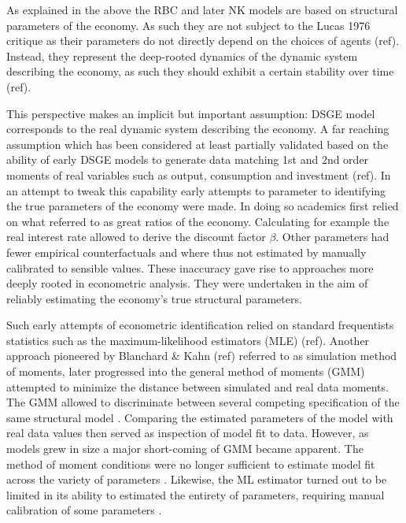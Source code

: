 \documentclass[12pt,a4paper,english]{article} %
\begin{document}
	As explained in the above the RBC and later NK models are based on structural parameters of the economy. As such they are not subject to the Lucas 1976 critique as their parameters do not  directly depend on the choices of agents (ref). Instead, they represent the deep-rooted dynamics of the dynamic system describing the economy, as such they should exhibit a certain stability over time (ref). 
	
	This perspective makes an implicit but important assumption: DSGE model corresponds to the real dynamic system describing the economy. A far reaching assumption which has been considered at least partially validated based on the ability of early DSGE models to generate data matching 1st and 2nd order moments of real variables such as output, consumption and investment (ref). 
	In an attempt to tweak this capability  early attempts to parameter to identifying the true parameters of the economy were made. In doing so academics first relied on what \cite{prescott_theory_1986} referred to as great ratios of the economy. Calculating for example the real interest rate allowed to derive the discount factor $\beta$. 
	Other parameters had fewer empirical counterfactuals and where thus not estimated by manually calibrated to sensible values. These inaccuracy gave rise to approaches more deeply rooted in econometric analysis. They were undertaken in the aim of reliably estimating the economy's true structural parameters.
	
	Such early attempts of econometric identification relied on standard frequentists statistics such as the maximum-likelihood estimators (MLE) (ref). Another approach pioneered by Blanchard \& Kahn (ref) referred to as simulation method of moments, later progressed into the general method of moments (GMM) attempted to minimize the distance between simulated and real data moments. The GMM allowed to discriminate between several competing specification of the same structural model \cite{christiano_current_1992}. Comparing the estimated parameters of the model with real data values then served as inspection of model fit to data. However, as models grew in size a major short-coming of GMM became apparent. The method of moment conditions were no longer sufficient to estimate model fit across the variety of parameters \cite{guerron-quintana_bayesian_2013}. Likewise, the ML estimator turned out to be limited in its ability to estimated the entirety of parameters, requiring manual calibration of some parameters \cite{guerron-quintana_bayesian_2013}.
	
\end{document}
